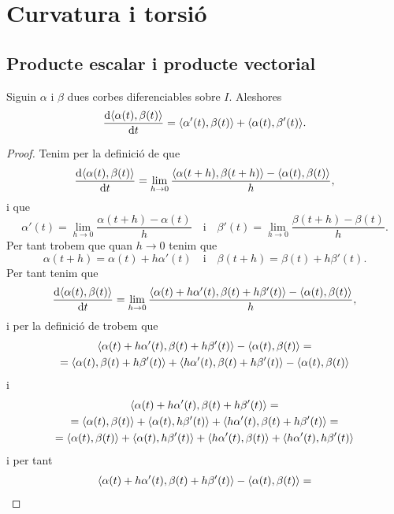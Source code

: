 \documentclass[../Apunts.tex]{subfiles}
\begin{document}
\section{Curvatura i torsió}
	\subsection{Producte escalar i producte vectorial}
	\begin{proposition}
		\label{prop:derivada del producte escalar de dues corbes}
		Siguin \(\alpha\) i \(\beta\) dues corbes diferenciables sobre \(I\). Aleshores
		\[\frac{\diff\prodesc{\alpha(t)}{\beta(t)}}{\diff t}=\prodesc{\alpha'(t)}{\beta(t)}+\prodesc{\alpha(t)}{\beta'(t)}.\]
	\end{proposition}
	\begin{proof}
		Tenim per la definició de  que
		\[\frac{\diff\prodesc{\alpha(t)}{\beta(t)}}{\diff t}=\lim_{h\to0}\frac{\prodesc{\alpha(t+h)}{\beta(t+h)}-\prodesc{\alpha(t)}{\beta(t)}}{h},\]
		i que
		\[\alpha'(t)=\lim_{h\to0}\frac{\alpha(t+h)-\alpha(t)}{h}\quad\text{i}\quad\beta'(t)=\lim_{h\to0}\frac{\beta(t+h)-\beta(t)}{h}.\]
		Per tant trobem que quan \(h\to0\) tenim que
		\[\alpha(t+h)=\alpha(t)+h\alpha'(t)\quad\text{i}\quad\beta(t+h)=\beta(t)+h\beta'(t).\]
		Per tant tenim que
		\[\frac{\diff\prodesc{\alpha(t)}{\beta(t)}}{\diff t}=\lim_{h\to0}\frac{\prodesc{\alpha(t)+h\alpha'(t)}{\beta(t)+h\beta'(t)}-\prodesc{\alpha(t)}{\beta(t)}}{h},\]
		i per la definició de  trobem que
		\begin{multline*}
			\prodesc{\alpha(t)+h\alpha'(t)}{\beta(t)+h\beta'(t)}-\prodesc{\alpha(t)}{\beta(t)}=\\
			=\prodesc{\alpha(t)}{\beta(t)+h\beta'(t)}+\prodesc{h\alpha'(t)}{\beta(t)+h\beta'(t)}-\prodesc{\alpha(t)}{\beta(t)}
		\end{multline*}
		i
		\begin{multline*}
			\prodesc{\alpha(t)+h\alpha'(t)}{\beta(t)+h\beta'(t)}=\\
			=\prodesc{\alpha(t)}{\beta(t)}+\prodesc{\alpha(t)}{h\beta'(t)}+\prodesc{h\alpha'(t)}{\beta(t)+h\beta'(t)}=\\
			=\prodesc{\alpha(t)}{\beta(t)}+\prodesc{\alpha(t)}{h\beta'(t)}+\prodesc{h\alpha'(t)}{\beta(t)}+\prodesc{h\alpha'(t)}{h\beta'(t)}
		\end{multline*}
		i per tant
		\begin{multline*}
			\prodesc{\alpha(t)+h\alpha'(t)}{\beta(t)+h\beta'(t)}-\prodesc{\alpha(t)}{\beta(t)}=\\

\end{multline*}
\end{proof}
\end{document}
